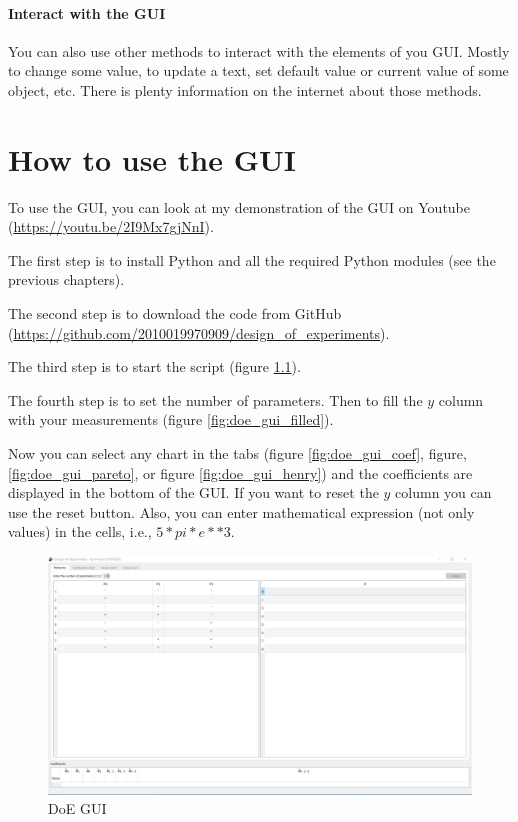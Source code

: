 \documentclass[english, 12 pt, openany, oneside]{book}
\begin{document}
\subsubsection{Interact with the GUI}
You can also use other methods to interact with the elements of you GUI. Mostly to change some value, to update a text, set default value or current value of some object, etc. There is plenty information on the internet about those methods.

\chapter{How to use the GUI}
To use the GUI, you can look at my demonstration of the GUI on Youtube (\url{https://youtu.be/2I9Mx7gjNnI}).

The first step is to install Python and all the required Python modules (see the previous chapters).

The second step is to download the code from GitHub (\url{https://github.com/2010019970909/design_of_experiments}).

The third step is to start the  script (figure \ref{fig:doe_gui}).

The fourth step is to set the number of parameters. Then to fill the $y$ column with your measurements (figure \ref{fig:doe_gui_filled}).

Now you can select any chart in the tabs (figure \ref{fig:doe_gui_coef}, figure, \ref{fig:doe_gui_pareto}, or figure \ref{fig:doe_gui_henry}) and the coefficients are displayed in the bottom of the GUI. If you want to reset the $y$ column you can use the reset button. Also, you can enter mathematical expression (not only values) in the cells, i.e., $5*pi*e**3$.

\begin{figure}[!ht]
\centering
\includegraphics[width=\linewidth]{doe_gui}
\caption{DoE GUI\label{fig:doe_gui}}
\end{figure}
\end{document}

